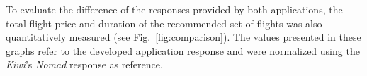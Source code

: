 To evaluate the difference of the responses provided by both applications, the total flight price and duration of the recommended set of flights was also quantitatively measured (see Fig.~\ref{fig:comparison}). The values presented in these graphs refer to the developed application response and were normalized using the \textit{Kiwi}'s \textit{Nomad} response as reference. 



